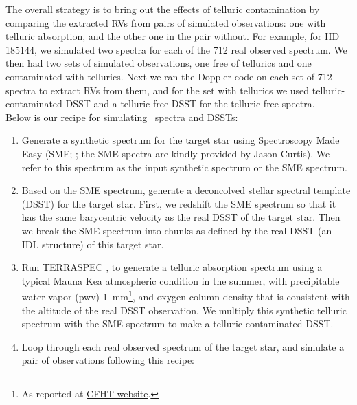 The overall strategy is to bring out the effects of telluric
contamination by comparing the extracted RVs from pairs of simulated
observations: one with telluric absorption, and the other one in the
pair without. For example, for HD 185144, we simulated two spectra for
each of the 712 real observed spectrum. We then had two sets of
simulated observations, one free of tellurics and one contaminated
with tellurics. Next we ran the Doppler code on each set of 712
spectra to extract RVs from them, and for the set with tellurics we
used telluric-contaminated DSST and a telluric-free DSST for the
telluric-free spectra. \\

Below is our recipe for simulating \keck\ spectra and DSSTs:
\begin{enumerate}
\item Generate a synthetic spectrum for the target star using
  Spectroscopy Made Easy (SME;
  \citealt{valentipiskunov1996,valentifischer2005}; the SME spectra are
  kindly provided by Jason Curtis). We refer to this spectrum as the
  input synthetic spectrum or the SME spectrum.
\item Based on the SME spectrum, generate a deconcolved stellar
  spectral template (DSST) for the target
  star. First, we redshift the SME spectrum so that it has the same
  barycentric velocity as the real DSST of the target star. Then we
  break the SME spectrum into chunks as defined by the real DSST (an IDL
  structure) of this target star.
\item Run TERRASPEC , to generate a telluric absorption spectrum using a
  typical Mauna Kea atmospheric condition in the summer, with
  precipitable water vapor (pwv) 1~mm\footnote{As reported at
    \href{http://www.cfht.hawaii.edu/Instruments/ObservatoryManual/CFHT_ObservatoryManual_(Sec_2).html}{CFHT
  website}.}, and oxygen column density that is consistent
  with the altitude of the real DSST observation. We multiply this
  synthetic telluric spectrum with the SME spectrum to make a
  telluric-contaminated DSST.
\item Loop through each real observed spectrum of the target star, and
  simulate a pair of observations following this recipe:

\end{enumerate}
